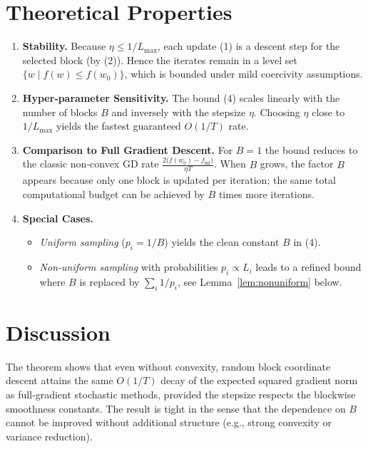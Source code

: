 \documentclass{article}
\begin{document}
\section*{Theoretical Properties}
\begin{enumerate}[label=\arabic*.]
\item \textbf{Stability.} Because $\eta\le1/L_{\max}$, each update (1) is a descent step for the selected block (by (2)). Hence the iterates remain in a level set $\{w\mid f(w)\le f(w_0)\}$, which is bounded under mild coercivity assumptions.

\item \textbf{Hyper‑parameter Sensitivity.} The bound (4) scales linearly with the number of blocks $B$ and inversely with the stepsize $\eta$. Choosing $\eta$ close to $1/L_{\max}$ yields the fastest guaranteed $O(1/T)$ rate.

\item \textbf{Comparison to Full Gradient Descent.} For $B=1$ the bound reduces to the classic non‑convex GD rate 
$\frac{2\bigl(f(w_0)-f_{\inf}\bigr)}{\eta T}$.  
When $B$ grows, the factor $B$ appears because only one block is updated per iteration; the same total computational budget can be achieved by $B$ times more iterations.

\item \textbf{Special Cases.}
\begin{itemize}
\item \emph{Uniform sampling} ($p_i=1/B$) yields the clean constant $B$ in (4).
\item \emph{Non‑uniform sampling} with probabilities $p_i\propto L_i$ leads to a refined bound where $B$ is replaced by $\sum_i 1/p_i$, see Lemma~\ref{lem:nonuniform} below.
\end{itemize}
\end{enumerate}

\section*{Discussion}
The theorem shows that even without convexity, random block coordinate descent attains the same $O(1/T)$ decay of the expected squared gradient norm as full‑gradient stochastic methods, provided the stepsize respects the blockwise smoothness constants. The result is tight in the sense that the dependence on $B$ cannot be improved without additional structure (e.g., strong convexity or variance reduction).

\newpage
\end{document}
